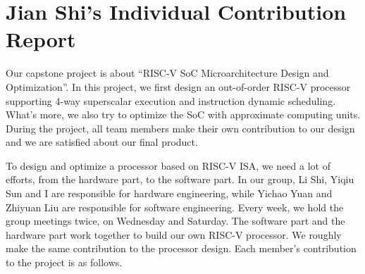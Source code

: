 \chapter*{Jian Shi's Individual Contribution Report}

Our capstone project is about ``RISC-V SoC Microarchitecture Design and Optimization''. In this project, we first design an out-of-order RISC-V processor supporting 4-way superscalar execution and instruction dynamic scheduling. What’s more, we also try to optimize the SoC with approximate computing units. During the project, all team members make their own contribution to our design and we are satisfied about our final product.

To design and optimize a processor based on RISC-V ISA, we need a lot of efforts, from the hardware part, to the software part. In our group, Li Shi, Yiqiu Sun and I are responsible for hardware engineering, while Yichao Yuan and Zhiyuan Liu are responsible for software engineering. Every week, we hold the group meetings twice, on Wednesday and Saturday. The software part and the hardware part work together to build our own RISC-V processor. We roughly make the same contribution to the processor design. Each member’s contribution to the project is as follows.

